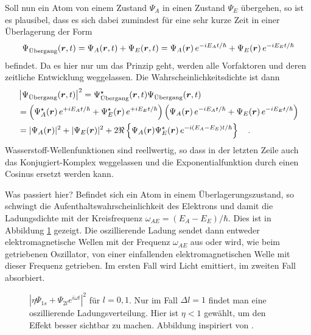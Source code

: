 Soll nun ein Atom von einem Zustand $\Psi_A$ in einen Zustand $\Psi_E$ übergehen, so ist es plausibel, dass es sich dabei zumindest für eine sehr kurze Zeit in einer Überlagerung der Form 
\begin{equation}
    \Psi_\text{Übergang} (\boldsymbol{r}, t) = \Psi_A(\boldsymbol{r}, t) + \Psi_E(\boldsymbol{r}, t) = 
    \Psi_A(\boldsymbol{r}) \, e^{-i E_A t / \hbar} +  \Psi_E(\boldsymbol{r}) \, e^{-i E_E t / \hbar}
\end{equation}
befindet. Da es hier nur um das Prinzip geht, werden alle Vorfaktoren und deren zeitliche Entwicklung weggelassen. Die Wahrscheinlichkeitsdichte ist dann
\begin{align}
    & \left| \Psi_\text{Übergang} (\boldsymbol{r}, t)  \right|^2 =  \Psi_\text{Übergang}^\star (\boldsymbol{r}, t) \Psi_\text{Übergang} (\boldsymbol{r}, t)  \\
   & =  \left(  \Psi_A^\star(\boldsymbol{r}) \, e^{+i E_A t / \hbar} +  \Psi_E^\star(\boldsymbol{r}) \, e^{+i E_E t / \hbar} \right)
    \left(  \Psi_A(\boldsymbol{r}) \, e^{-i E_A t / \hbar} +  \Psi_E(\boldsymbol{r}) \, e^{-i E_E t / \hbar} \right) \\
    & = | \Psi_A(\boldsymbol{r})|^2 + | \Psi_E(\boldsymbol{r})|^2  + 2 \Re \left\{ \Psi_A(\boldsymbol{r})\Psi_E^\star(\boldsymbol{r})  \, e^{-i (E_A - E_E) t / \hbar}  \right\}   \quad .
\end{align}
Wasserstoff-Wellenfunktionen sind reellwertig, so dass in der letzten Zeile auch das Konjugiert-Komplex weggelassen und die Exponentialfunktion durch einen Cosinus ersetzt werden kann.

Was passiert hier? Befindet sich ein Atom in einem Überlagerungszustand, so schwingt die Aufenthaltswahrscheinlichkeit des Elektrons und damit die Ladungsdichte mit der Kreisfrequenz $\omega_{AE} = (E_A - E_E) / \hbar $. Dies ist in Abbildung  \ref{fig:7_transition_panel} gezeigt. Die oszillierende Ladung sendet dann entweder elektromagnetische Wellen mit der Frequenz $\omega_{AE}$ aus oder wird, wie beim getriebenen Oszillator, von einer einfallenden elektromagnetischen Welle mit dieser Frequenz getrieben. Im ersten Fall wird Licht emittiert, im zweiten Fall absorbiert.

\begin{figure}    
    \caption{ $| \eta \Psi_{1s} + \Psi_{2l} e^{i \omega t}|^2$ für $l= 0,1$. Nur im Fall $\Delta l = 1$ findet man eine oszillierende Ladungsverteilung. Hier ist $\eta < 1$ gewählt, um den Effekt besser sichtbar zu machen. Abbildung inspiriert von \cite{Reider_photonik}.}
    \label{fig:7_transition_panel}
\end{figure}



